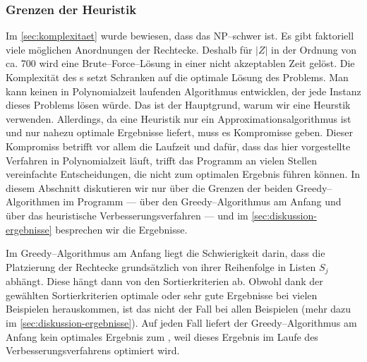 \subsubsection{Grenzen der Heuristik}\label{sec:diskussion-grenzen}
Im \cref{sec:komplexitaet} wurde bewiesen, dass das \fp{} NP--schwer ist.
Es gibt faktoriell viele möglichen Anordnungen der Rechtecke.
Deshalb für $|Z|$ in der Ordnung von ca. 700 wird eine Brute--Force--Lösung in einer nicht
akzeptablen Zeit gelöst.
Die Komplexität des \fp{}s setzt Schranken auf die optimale Lösung des Problems.
Man kann keinen in Polynomialzeit laufenden Algorithmus entwicklen, der jede Instanz dieses
Problems lösen würde.
Das ist der Hauptgrund, warum wir eine Heurstik verwenden.
Allerdings, da eine Heuristik nur ein Approximationsalgorithmus ist und
nur nahezu optimale Ergebnisse liefert, muss es Kompromisse geben.
Dieser Kompromiss betrifft vor allem die Laufzeit und 
dafür, dass das hier vorgestellte Verfahren in Polynomialzeit läuft, 
trifft das Programm an vielen Stellen vereinfachte Entscheidungen,
die nicht zum optimalen Ergebnis führen können.
In diesem Abschnitt diskutieren wir nur über die Grenzen der beiden Greedy--Algorithmen im Programm 
--- über den Greedy--Algorithmus am Anfang und über das heuristische 
Verbesserungsverfahren ---
und im \cref{sec:diskussion-ergebnisse} besprechen wir die Ergebnisse.


Im Greedy--Algorithmus am Anfang liegt die Schwierigkeit darin, dass
die Platzierung der Rechtecke grundsätzlich von ihrer Reihenfolge 
in Listen $S_j$ abhängt. Diese hängt dann von den Sortierkriterien ab. 
Obwohl dank der gewählten Sortierkriterien optimale oder sehr gute Ergebnisse
bei vielen Beispielen herauskommen, ist das nicht der Fall bei allen Beispielen
(mehr dazu im \cref{sec:diskussion-ergebnisse}).
Auf jeden Fall liefert der Greedy--Algorithmus am Anfang kein optimales Ergebnis zum ,
weil dieses Ergebnis im Laufe des Verbesserungsverfahrens optimiert wird.


